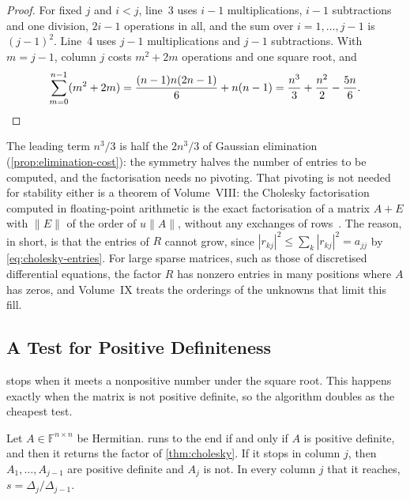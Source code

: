 \begin{proof}
For fixed $j$ and $i<j$, line~3 uses $i-1$ multiplications, $i-1$ subtractions and one division, $2i-1$ operations in all, and the sum over $i=1,\ldots,j-1$ is $(j-1)^2$. Line~4 uses $j-1$ multiplications and $j-1$ subtractions. With $m=j-1$, column $j$ costs $m^2+2m$ operations and one square root, and
\[
\sum_{m=0}^{n-1}(m^2+2m)=\frac{(n-1)n(2n-1)}6+n(n-1)=\frac{n^3}3+\frac{n^2}2-\frac{5n}6 .\qedhere
\]
\end{proof}

The leading term $n^3/3$ is half the $2n^3/3$ of Gaussian elimination (\cref{prop:elimination-cost}): the symmetry halves the number of entries to be computed, and the factorisation needs no pivoting. That pivoting is not needed for stability either is a theorem of Volume~VIII: the Cholesky factorisation computed in floating-point arithmetic is the exact factorisation of a matrix $A+E$ with $\|E\|$ of the order of $u\|A\|$, without any exchanges of rows~\cite[Chap.~10]{higham2002accuracy}. The reason, in short, is that the entries of $R$ cannot grow, since $|r_{kj}|^2\le\sum_k|r_{kj}|^2=a_{jj}$ by \eqref{eq:cholesky-entries}. For large sparse matrices, such as those of discretised differential equations, the factor $R$ has nonzero entries in many positions where $A$ has zeros, and Volume~IX treats the orderings of the unknowns that limit this fill.

\subsection{A Test for Positive Definiteness}

 stops when it meets a nonpositive number under the square root. This happens exactly when the matrix is not positive definite, so the algorithm doubles as the cheapest test.

\begin{proposition}
\label{prop:cholesky-test}
Let $A\in\mathbb F^{n\times n}$ be Hermitian.  runs to the end if and only if $A$ is positive definite, and then it returns the factor of \cref{thm:cholesky}. If it stops in column $j$, then $A_1,\ldots,A_{j-1}$ are positive definite and $A_j$ is not. In every column $j$ that it reaches, $s=\Delta_j/\Delta_{j-1}$.
\end{proposition}

